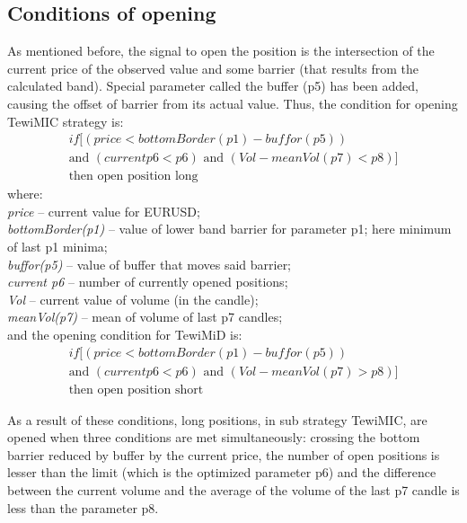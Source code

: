 \documentclass{tewiart}
\begin{document}
\subsection{Conditions of opening}
As mentioned before, the signal to open the position is the intersection of the current price of the observed value and some barrier (that results from the calculated band). Special parameter called the buffer (p5) has been added, causing the offset of barrier from its actual value. Thus, the condition for opening TewiMIC strategy is: 
\begin{equation}
\begin{split}
if[(price < bottomBorder(p1) - buffor(p5)) \\ 
\text{and } (current p6 < p6) \text{ and } (Vol - meanVol(p7) < p8)] \\
\text{then open position long}
\end{split}
\end{equation}
where:\\
\textit{price} – current value for EURUSD;\\
\textit{bottomBorder(p1)} – value of lower band barrier for parameter p1; here minimum of last p1 minima; \\
\textit{buffor(p5)} – value of buffer that moves said barrier;\\
\textit{current p6} – number of currently opened positions;\\
\textit{Vol} – current value of volume (in the candle);\\
\textit{meanVol(p7)} – mean of volume of last p7 candles;\\

\noindent and the opening condition for TewiMiD is:
\begin{equation}
\begin{split}
if[(price < bottomBorder(p1) - buffor(p5)) \\ 
\text{and } (current p6 < p6) \text{ and } (Vol - meanVol(p7) > p8)] \\
\text{then open position short}
\end{split}
\end{equation}

As a result of these conditions, long positions, in sub strategy TewiMIC, are opened when three conditions are met simultaneously: crossing the bottom barrier reduced by buffer by the current price, the number of open positions is lesser than the limit (which is the optimized parameter p6) and the difference between the current volume and the average of the volume of the last p7 candle is less than the parameter p8.\\
\end{document}
